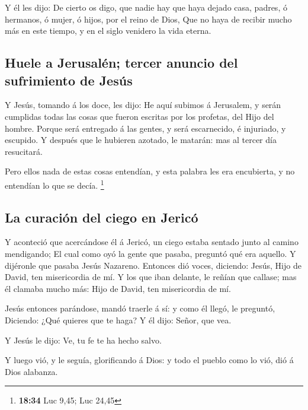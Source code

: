  Y él les dijo: De cierto os digo, que nadie hay que haya
dejado casa, padres, ó hermanos, ó mujer, ó hijos, por el reino de Dios,
 Que no haya de recibir mucho más en este tiempo, y en el
siglo venidero la vida eterna.

\hypertarget{huele-a-jerusaluxe9n-tercer-anuncio-del-sufrimiento-de-jesuxfas}{%
\subsection{Huele a Jerusalén; tercer anuncio del sufrimiento de
Jesús}\label{huele-a-jerusaluxe9n-tercer-anuncio-del-sufrimiento-de-jesuxfas}}

 Y Jesús, tomando á los doce, les dijo: He aquí subimos á
Jerusalem, y serán cumplidas todas las cosas que fueron escritas por los
profetas, del Hijo del hombre.  Porque será entregado á las
gentes, y será escarnecido, é injuriado, y escupido.  Y
después que le hubieren azotado, le matarán: mas al tercer día
resucitará.

 Pero ellos nada de estas cosas entendían, y esta palabra
les era encubierta, y no entendían lo que se decía. \footnote{\textbf{18:34}
  Luc 9,45; Luc 24,45}

\hypertarget{la-curaciuxf3n-del-ciego-en-jericuxf3}{%
\subsection{La curación del ciego en
Jericó}\label{la-curaciuxf3n-del-ciego-en-jericuxf3}}

 Y aconteció que acercándose él á Jericó, un ciego estaba
sentado junto al camino mendigando;  El cual como oyó la
gente que pasaba, preguntó qué era aquello.  Y dijéronle
que pasaba Jesús Nazareno.  Entonces dió voces, diciendo:
Jesús, Hijo de David, ten misericordia de mí.  Y los que
iban delante, le reñían que callase; mas él clamaba mucho más: Hijo de
David, ten misericordia de mí.

 Jesús entonces parándose, mandó traerle á sí: y como él
llegó, le preguntó,  Diciendo: ¿Qué quieres que te haga? Y
él dijo: Señor, que vea.

 Y Jesús le dijo: Ve, tu fe te ha hecho salvo.

 Y luego vió, y le seguía, glorificando á Dios: y todo el
pueblo como lo vió, dió á Dios alabanza.

